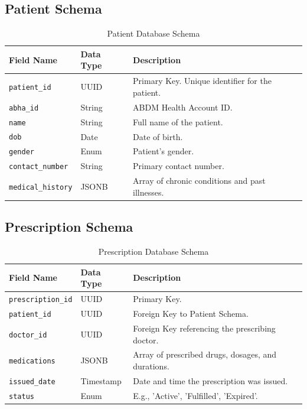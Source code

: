 \subsection{Patient Schema}
\begin{table}[h!]
    \centering
    \begin{tabular}{|l|l|p{6cm}|}
        \hline
        \textbf{Field Name} & \textbf{Data Type} & \textbf{Description} \\
        \hline
        \texttt{patient\_id} & UUID & Primary Key. Unique identifier for the patient. \\
        \texttt{abha\_id} & String & ABDM Health Account ID. \\
        \texttt{name} & String & Full name of the patient. \\
        \texttt{dob} & Date & Date of birth. \\
        \texttt{gender} & Enum & Patient's gender. \\
        \texttt{contact\_number} & String & Primary contact number. \\
        \texttt{medical\_history} & JSONB & Array of chronic conditions and past illnesses. \\
        \hline
    \end{tabular}
    \caption{Patient Database Schema}
    \label{tab:app_patient_schema}
\end{table}

\subsection{Prescription Schema}
\begin{table}[h!]
    \centering
    \begin{tabular}{|l|l|p{6cm}|}
        \hline
        \textbf{Field Name} & \textbf{Data Type} & \textbf{Description} \\
        \hline
        \texttt{prescription\_id} & UUID & Primary Key. \\
        \texttt{patient\_id} & UUID & Foreign Key to Patient Schema. \\
        \texttt{doctor\_id} & UUID & Foreign Key referencing the prescribing doctor. \\
        \texttt{medications} & JSONB & Array of prescribed drugs, dosages, and durations. \\
        \texttt{issued\_date} & Timestamp & Date and time the prescription was issued. \\
        \texttt{status} & Enum & E.g., 'Active', 'Fulfilled', 'Expired'. \\
        \hline
    \end{tabular}
    \caption{Prescription Database Schema}
    \label{tab:app_prescription_schema}
\end{table}

